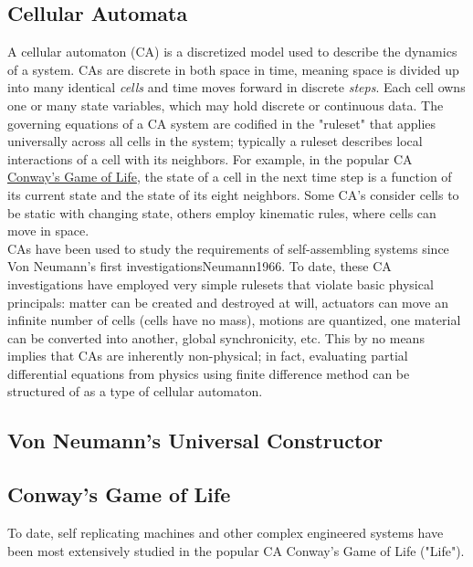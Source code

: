 {\subsection{Cellular Automata}

A cellular automaton (CA) is a discretized model used to describe the dynamics of a system.  CAs are discrete in both space in time, meaning space is divided up into many identical \textit{cells} and time moves forward in discrete \textit{steps}.  Each cell owns one or many state variables, which may hold discrete or continuous data.  The governing equations of a CA system are codified in the "ruleset" that applies universally across all cells in the system; typically a ruleset describes local interactions of a cell with its neighbors.  For example, in the popular CA \href{https://en.wikipedia.org/wiki/Conway's_Game_of_Life}{Conway's Game of Life}, the state of a cell in the next time step is a function of its current state and the state of its eight neighbors.  Some CA's consider cells to be static with changing state, others employ kinematic rules, where cells can move in space.\\

CAs have been used to study the requirements of self-assembling systems since Von Neumann's first investigations{Neumann1966}.  To date, these CA investigations have employed very simple rulesets that violate basic physical principals: matter can be created and destroyed at will, actuators can move an infinite number of cells (cells have no mass), motions are quantized, one material can be converted into another, global synchronicity, etc.  This by no means implies that CAs are inherently non-physical; in fact, evaluating partial differential equations from physics using finite difference method can be structured of as a type of cellular automaton\cite{Yang2010}.

\subsection{Von Neumann's Universal Constructor}



\subsection{Conway's Game of Life}

To date, self replicating machines and other complex engineered systems have been most extensively studied in the popular CA Conway's Game of Life ("Life").\\

}
